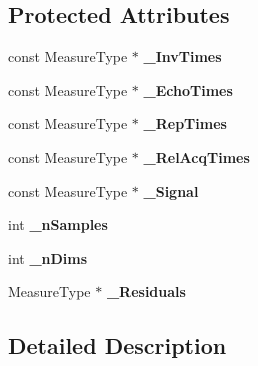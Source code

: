 \subsection*{Protected Attributes}
\begin{DoxyCompactItemize}
\item 
const Measure\+Type $\ast$ {\bfseries \+\_\+\+Inv\+Times}\hypertarget{class_ox_1_1_model_a20eb4db9cd1fa1cd0fa4b46e06e08d9c}{}\label{class_ox_1_1_model_a20eb4db9cd1fa1cd0fa4b46e06e08d9c}

\item 
const Measure\+Type $\ast$ {\bfseries \+\_\+\+Echo\+Times}\hypertarget{class_ox_1_1_model_a7b00c7d8554d101dfdf86b2013200983}{}\label{class_ox_1_1_model_a7b00c7d8554d101dfdf86b2013200983}

\item 
const Measure\+Type $\ast$ {\bfseries \+\_\+\+Rep\+Times}\hypertarget{class_ox_1_1_model_af2c4ac111d41ce5b6d5ca9f66ad36918}{}\label{class_ox_1_1_model_af2c4ac111d41ce5b6d5ca9f66ad36918}

\item 
const Measure\+Type $\ast$ {\bfseries \+\_\+\+Rel\+Acq\+Times}\hypertarget{class_ox_1_1_model_a093e159893a4ebf36452e470cda9a4d1}{}\label{class_ox_1_1_model_a093e159893a4ebf36452e470cda9a4d1}

\item 
const Measure\+Type $\ast$ {\bfseries \+\_\+\+Signal}\hypertarget{class_ox_1_1_model_a810156ed7ea865fa0980e6b05128a80c}{}\label{class_ox_1_1_model_a810156ed7ea865fa0980e6b05128a80c}

\item 
int {\bfseries \+\_\+n\+Samples}\hypertarget{class_ox_1_1_model_a1eb1604ca7c4587d4cb66ccc1d068adc}{}\label{class_ox_1_1_model_a1eb1604ca7c4587d4cb66ccc1d068adc}

\item 
int {\bfseries \+\_\+n\+Dims}\hypertarget{class_ox_1_1_model_ae7c67e12cb601aafcce580b008d918cd}{}\label{class_ox_1_1_model_ae7c67e12cb601aafcce580b008d918cd}

\item 
Measure\+Type $\ast$ {\bfseries \+\_\+\+Residuals}\hypertarget{class_ox_1_1_model_a4f95dba7c1751745f8087e6cb98ba486}{}\label{class_ox_1_1_model_a4f95dba7c1751745f8087e6cb98ba486}

\end{DoxyCompactItemize}


\subsection{Detailed Description}
